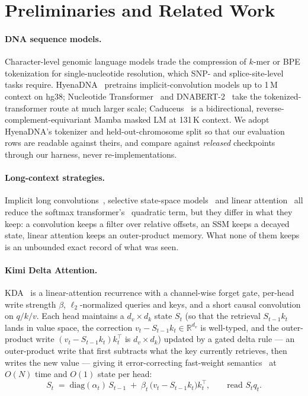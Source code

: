 \documentclass[11pt]{article}
\theoremstyle{plain}
\begin{document}
\section{Preliminaries and Related Work}\label{sec:bg}

\paragraph{DNA sequence models.} Character-level genomic language models trade the compression of
$k$-mer or BPE tokenization for single-nucleotide resolution, which SNP- and splice-site-level
tasks require. HyenaDNA~\cite{nguyen2023hyenadna} pretrains implicit-convolution models up to 1\,M
context on hg38; Nucleotide Transformer~\cite{dallatorre2025nucleotide} and
DNABERT-2~\cite{zhou2024dnabert2} take the tokenized-transformer route at much larger scale;
Caduceus~\cite{schiff2024caduceus} is a bidirectional, reverse-complement-equivariant Mamba masked
LM at 131\,K context. We adopt HyenaDNA's tokenizer and held-out-chromosome split so that our
evaluation rows are readable against theirs, and compare against \emph{released} checkpoints
through our harness, never re-implementations.

\paragraph{Long-context strategies.} Implicit long convolutions~\cite{poli2023hyena}, selective
state-space models~\cite{gu2024mamba} and linear attention~\cite{katharopoulos2020transformers}
all reduce the softmax transformer's~\cite{vaswani2017attention} quadratic term, but they differ
in what they keep: a convolution
keeps a filter over relative offsets, an SSM keeps a decayed state, linear attention keeps an
outer-product memory. What none of them keeps is an unbounded exact record of what was seen.

\paragraph{Kimi Delta Attention.} KDA~\cite{kimilinear2025} is a linear-attention recurrence with
a channel-wise forget gate, per-head write strength $\beta$, $\ell_2$-normalized queries and keys,
and a short causal convolution on $q/k/v$. Each head maintains a $d_v\times d_k$ state $S_t$
(so that the retrieval $S_{t-1}k_t$ lands in value space, the correction
$v_t - S_{t-1}k_t \in \mathbb{R}^{d_v}$ is well-typed, and the outer-product write
$(v_t - S_{t-1}k_t)k_t^{\top}$ is $d_v\times d_k$) updated by a gated delta rule --- an
outer-product write that first subtracts what the key currently retrieves, then writes the new
value --- giving it error-correcting fast-weight
semantics~\cite{schlag2021linear,arora2023zoology} at $O(N)$ time and $O(1)$ state per head:
\begin{equation}
S_t \;=\; \mathrm{diag}(\alpha_t)\,S_{t-1} \;+\; \beta_t\,\bigl(v_t - S_{t-1}k_t\bigr)k_t^{\top},
\qquad \text{read } S_t q_t .
\label{eq:kda}
\end{equation}
\end{document}
